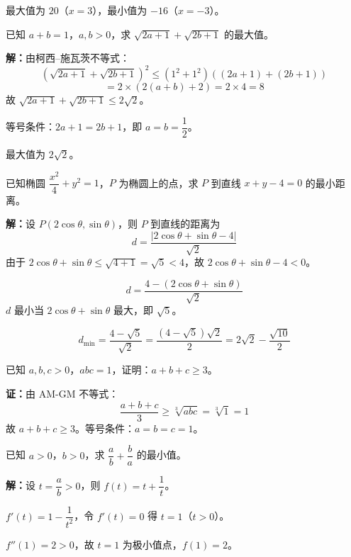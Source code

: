 \documentclass[12pt, a4paper]{ctexart}
\begin{document}
最大值为 $\boxed{20}$（$x = 3$），最小值为 $\boxed{-16}$（$x = -3$）。

\begin{examplebox}
已知 $a + b = 1$，$a, b > 0$，求 $\sqrt{2a + 1} + \sqrt{2b + 1}$ 的最大值。
\end{examplebox}

\textbf{解：}由柯西--施瓦茨不等式：
\[ \left(\sqrt{2a+1} + \sqrt{2b+1}\right)^2 \le (1^2 + 1^2)\left((2a+1) + (2b+1)\right) \]
\[ = 2 \times (2(a+b) + 2) = 2 \times 4 = 8 \]
故 $\sqrt{2a+1} + \sqrt{2b+1} \le 2\sqrt{2}$。

等号条件：$2a + 1 = 2b + 1$，即 $a = b = \dfrac{1}{2}$。

最大值为 $\boxed{2\sqrt{2}}$。

\begin{examplebox}[【例题7】解析几何中的最值]
已知椭圆 $\dfrac{x^2}{4} + y^2 = 1$，$P$ 为椭圆上的点，求 $P$ 到直线 $x + y - 4 = 0$ 的最小距离。
\end{examplebox}

\textbf{解：}设 $P(2\cos\theta, \sin\theta)$，则 $P$ 到直线的距离为
\[ d = \frac{|2\cos\theta + \sin\theta - 4|}{\sqrt{2}} \]
由于 $2\cos\theta + \sin\theta \le \sqrt{4+1} = \sqrt{5} < 4$，故 $2\cos\theta + \sin\theta - 4 < 0$。

\[ d = \frac{4 - (2\cos\theta + \sin\theta)}{\sqrt{2}} \]
$d$ 最小当 $2\cos\theta + \sin\theta$ 最大，即 $\sqrt{5}$。

\[ d_{\min} = \frac{4 - \sqrt{5}}{\sqrt{2}} = \frac{(4 - \sqrt{5})\sqrt{2}}{2} = \boxed{2\sqrt{2} - \frac{\sqrt{10}}{2}} \]

\begin{examplebox}[【例题8】不等式证明——AM-GM]
已知 $a, b, c > 0$，$abc = 1$，证明：$a + b + c \ge 3$。
\end{examplebox}

\textbf{证：}由 AM-GM 不等式：
\[ \frac{a + b + c}{3} \ge \sqrt[3]{abc} = \sqrt[3]{1} = 1 \]
故 $a + b + c \ge 3$。等号条件：$a = b = c = 1$。

\begin{examplebox}
已知 $a > 0$，$b > 0$，求 $\dfrac{a}{b} + \dfrac{b}{a}$ 的最小值。
\end{examplebox}

\textbf{解：}设 $t = \dfrac{a}{b} > 0$，则 $f(t) = t + \dfrac{1}{t}$。

$f'(t) = 1 - \dfrac{1}{t^2}$，令 $f'(t) = 0$ 得 $t = 1$（$t > 0$）。

$f''(1) = 2 > 0$，故 $t = 1$ 为极小值点，$f(1) = 2$。
\end{document}

